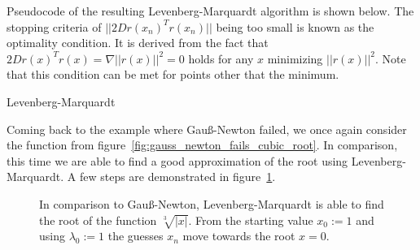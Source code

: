 Pseudocode of the resulting Levenberg-Marquardt algorithm is shown below. The stopping criteria of $||2Dr(x_n)^Tr(x_n)||$ being too small is known as the optimality condition. It is derived from the fact that $2Dr(x)^Tr(x) = \nabla||r(x)||^2 = 0$ holds for any $x$ minimizing $||r(x)||^2$. Note that this condition can be met for points other that the minimum.

\begin{algorithm}[H] \label{alg:levenberg-marquardt}
	\SetAlgoLined
	\DontPrintSemicolon
	\LinesNumbered
	\caption{Levenberg-Marquardt}
	
	\BlankLine
\end{algorithm}
\vspace{1cm}

Coming back to the example where Gauß-Newton failed, we once again consider the function from figure~\ref{fig:gauss_newton_fails_cubic_root}. In comparison, this time we are able to find a good approximation of the root using Levenberg-Marquardt. A few steps are demonstrated in figure~\ref{fig:levenberg-marquardt-example}.

\begin{figure}[h]
	\centering
	\caption{In comparison to Gauß-Newton, Levenberg-Marquardt is able to find the root of the function $\sqrt[3]{|x|}$. From the starting value $x_0 := 1$ and using $\lambda_0 := 1$ the guesses $x_n$ move towards the root $x=0$.}
	\label{fig:levenberg-marquardt-example}
\end{figure}

